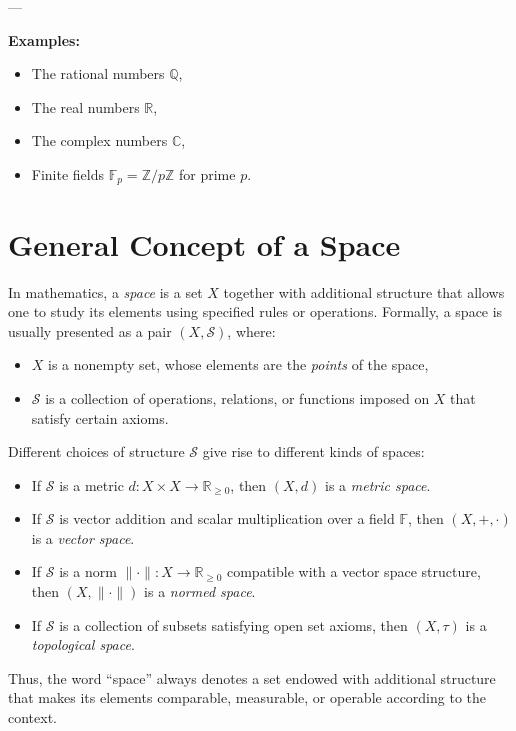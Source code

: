\documentclass[11pt,a4paper]{article}
\theoremstyle{definition}
\theoremstyle{remark}
\begin{document}
	---
	
	\textbf{Examples:}
	\begin{itemize}
		\item The rational numbers $\mathbb{Q}$,
		\item The real numbers $\mathbb{R}$,
		\item The complex numbers $\mathbb{C}$,
		\item Finite fields $\mathbb{F}_p = \mathbb{Z}/p\mathbb{Z}$ for prime $p$.
	\end{itemize}
	
	\section*{General Concept of a Space}
	
	In mathematics, a \emph{space} is a set $X$ together with additional structure that allows one to study its elements using specified rules or operations. 
	Formally, a space is usually presented as a pair $(X,\mathcal{S})$, where:
	
	\begin{itemize}
		\item $X$ is a nonempty set, whose elements are the \emph{points} of the space,
		\item $\mathcal{S}$ is a collection of operations, relations, or functions imposed on $X$ that satisfy certain axioms.
	\end{itemize}
	
	Different choices of structure $\mathcal{S}$ give rise to different kinds of spaces:
	
	\begin{itemize}
		\item If $\mathcal{S}$ is a metric $d : X \times X \to \mathbb{R}_{\geq 0}$, then $(X,d)$ is a \emph{metric space}.
		\item If $\mathcal{S}$ is vector addition and scalar multiplication over a field $\mathbb{F}$, then $(X,+,\cdot)$ is a \emph{vector space}.
		\item If $\mathcal{S}$ is a norm $\|\cdot\|: X \to \mathbb{R}_{\geq 0}$ compatible with a vector space structure, then $(X,\|\cdot\|)$ is a \emph{normed space}.
		\item If $\mathcal{S}$ is a collection of subsets satisfying open set axioms, then $(X,\tau)$ is a \emph{topological space}.
	\end{itemize}
	
	Thus, the word ``space'' always denotes a set endowed with additional structure that makes its elements comparable, measurable, or operable according to the context.
	
\end{document}
